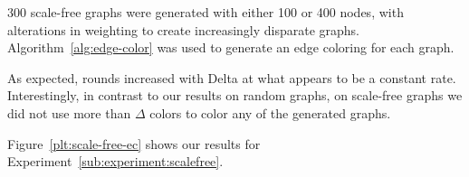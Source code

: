 300 scale-free graphs were generated with either 100 or 400 nodes, with alterations in weighting to create increasingly disparate graphs. Algorithm~\ref{alg:edge-color} was used to generate an edge coloring for each graph.

As expected, rounds increased with Delta at what appears to be a constant rate. Interestingly, in contrast to our results on random graphs, on scale-free graphs we did not use more than $\Delta$ colors to color any of the generated graphs.

Figure~\ref{plt:scale-free-ec} shows our results for Experiment~\ref{sub:experiment:scalefree}.


